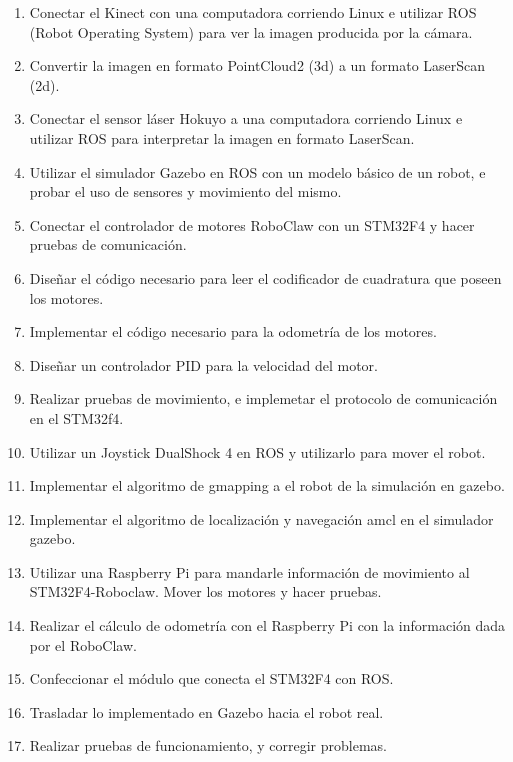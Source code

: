 \begin{enumerate}  %
    \item Conectar el Kinect con una computadora corriendo Linux e utilizar ROS (Robot Operating System) para ver la imagen producida por la cámara.
    \item Convertir la imagen en formato PointCloud2 (3d) a un formato LaserScan (2d).
    \item Conectar el sensor láser Hokuyo a una computadora corriendo Linux e utilizar ROS para interpretar la imagen en formato LaserScan.
    \item Utilizar el simulador Gazebo en ROS con un modelo básico de un robot, e probar el uso de sensores y movimiento del mismo.
    \item Conectar el controlador de motores RoboClaw con un STM32F4 y hacer pruebas de comunicación.
    \item Diseñar el código necesario para leer el codificador de cuadratura que poseen los motores.
    \item Implementar el código necesario para la odometría de los motores.
    \item Diseñar un controlador PID para la velocidad del motor.
    \item Realizar pruebas de movimiento, e implemetar el protocolo de comunicación en el STM32f4.
    \item Utilizar un Joystick DualShock 4 en ROS y utilizarlo para mover el robot.
    \item Implementar el algoritmo de gmapping a el robot de la simulación en gazebo.
    \item Implementar el algoritmo de localización y navegación amcl en el simulador gazebo.
    \item Utilizar una Raspberry Pi para mandarle información de movimiento al STM32F4-Roboclaw. Mover los motores y hacer pruebas.
    \item Realizar el cálculo de odometría con el Raspberry Pi con la información dada por el RoboClaw.
    \item Confeccionar el módulo que conecta el STM32F4 con ROS.
    \item Trasladar lo implementado en Gazebo hacia el robot real.
    \item Realizar pruebas de funcionamiento, y corregir problemas.
\end{enumerate}
